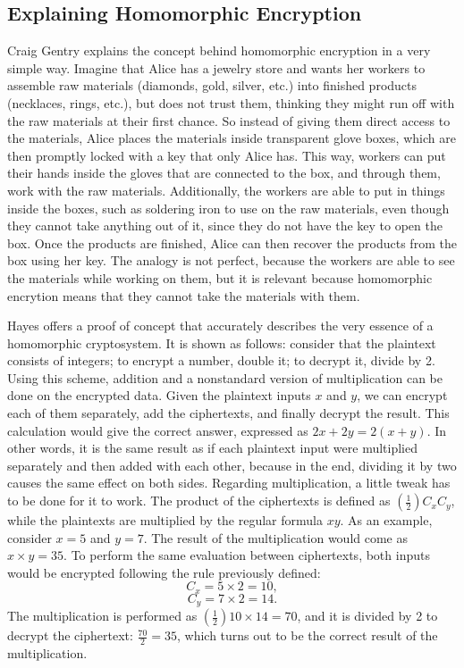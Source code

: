 \subsection{Explaining Homomorphic Encryption}

Craig Gentry \cite{homoenc} explains the concept behind homomorphic encryption in a very simple way. Imagine that Alice has a jewelry store and wants her workers to assemble raw materials (diamonds, gold, silver, etc.) into finished products (necklaces, rings, etc.), but does not trust them, thinking they might run off with the raw materials at their first chance. So instead of giving them direct access to the materials, Alice places the materials inside transparent glove boxes, which are then promptly locked with a key that only Alice has. This way, workers can put their hands inside the gloves that are connected to the box, and through them, work with the raw materials. Additionally, the workers are able to put in things inside the boxes, such as soldering iron to use on the raw materials, even though they cannot take anything out of it, since they do not have the key to open the box. Once the products are finished, Alice can then recover the products from the box using her key. The analogy is not perfect, because the workers are able to see the materials while working on them, but it is relevant because homomorphic encrytion means that they cannot take the materials with them.

Hayes \cite{Hayes2012} offers a proof of concept that accurately describes the very essence of a homomorphic cryptosystem. It is shown as follows: consider that the plaintext consists of integers; to encrypt a number, double it; to decrypt it, divide by 2. Using this scheme, addition and a nonstandard version of multiplication can be done on the encrypted data. Given the plaintext inputs $x$ and $y$, we can encrypt each of them separately, add the ciphertexts, and finally decrypt the result. This calculation would give the correct answer, expressed as $2x+2y=2(x+y)$. In other words, it is the same result as if each plaintext input were multiplied separately and then added with each other, because in the end, dividing it by two causes the same effect on both sides. 
Regarding multiplication, a little tweak has to be done for it to work. The product of the ciphertexts is defined as $(\frac{1}{2}) C_x C_y$, while the plaintexts are multiplied by the regular formula $xy$. 
As an example, consider $x=5$ and $y=7$. The result of the multiplication would come as $x \times y = 35$. To perform the same evaluation between ciphertexts, both inputs would be encrypted following the rule previously defined:
\begin{equation}
C_{x} = 5 \times 2 = 10,
\end{equation}
\begin{equation}
C_{y} = 7 \times 2 = 14.
\end{equation}
The multiplication is performed as $(\frac{1}{2}) 10 \times 14 = 70$, and it is divided by 2 to decrypt the ciphertext: $\frac{70}{2} = 35$, which turns out to be the correct result of the multiplication.

